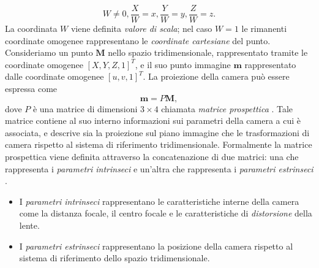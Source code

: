 \[W\neq 0,
\frac{X}{W}=x,
\frac{Y}{W}=y,
\frac{Z}{W}=z.\]
La coordinata $W$ viene definita \textit{valore di scala}; nel caso $W=1$ le rimanenti coordinate omogenee rappresentano le \textit{coordinate cartesiane} del punto.\\
Consideriamo un punto $\textbf{M}$ nello spazio tridimensionale, rappresentato tramite le coordinate omogenee $[X,Y,Z,1]^\textit{T}$, e il suo punto immagine $\textbf{m}$ rappresentato dalle coordinate omogenee $[u,v,1]^\textit{T}$.
La proiezione della camera pu\`o essere espressa come
\begin{equation}
\label{eq:proiezione}
\textbf{m}=P\textbf{M},
\end{equation}
dove $P$ \`e una matrice di dimensioni $3 \times 4$ chiamata \textit{matrice prospettica} \cite{hartley2003multiple}.
Tale matrice contiene al suo interno informazioni sui parametri della camera a cui \`e associata, e descrive sia la proiezione sul piano immagine che le trasformazioni di camera rispetto al sistema di riferimento tridimensionale.
Formalmente la matrice prospettica viene definita attraverso la concatenazione di due matrici: una che rappresenta i \textit{parametri intrinseci} e un'altra che rappresenta i \textit{parametri estrinseci} \cite{forsyth2002computer}.
\begin{itemize}
	\item I \textit{parametri intrinseci} rappresentano le caratteristiche interne della camera come la distanza focale, il centro focale e le caratteristiche di \textit{distorsione} della lente.
	\item I \textit{parametri estrinseci} rappresentano la posizione della camera rispetto al sistema di riferimento dello spazio tridimensionale.
\end{itemize} 
